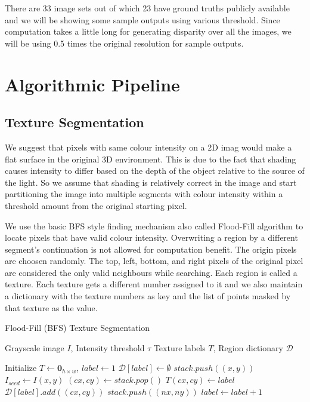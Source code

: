 \documentclass{article}
\begin{document}
There are 33 image sets out of which 23 have ground truths publicly available and we will be showing some sample outputs using various threshold. Since computation takes a little long 
for generating disparity over all the images, we will be using 0.5 times the original resolution for sample outputs.

\newpage
\section{Algorithmic Pipeline}
\vspace{1cm}
\subsection{Texture Segmentation}
\vspace{1cm}
We suggest that pixels with same colour intensity on a 2D imag would make a flat surface in the original 3D environment. This is due to the fact that shading causes intensity to 
differ based on the depth of the object relative to the source of the light. So we assume that shading is relatively correct in the image and start partitioning the image into 
multiple segments with colour intensity within a threshold amount from the original starting pixel. 

We use the basic BFS style finding mechanism also called Flood-Fill algorithm to locate pixels that have valid colour intensity. Overwriting a region by a different segment's 
continuation is not allowed for computation benefit. The origin pixels are choosen randomly. The top, left, bottom, and right pixels of the original pixel are considered 
the only valid neighbours while searching. Each region is called a texture. Each texture gets a different number assigned to it and we also maintain a dictionary with the texture numbers
as key and the list of points masked by that texture as the value.
\medskip
\begin{algorithm}[H]
\caption{Flood-Fill (BFS) Texture Segmentation}
\begin{algorithmic}[1]
\Require{} Grayscale image $I$, Intensity threshold $\tau$
\Ensure{}{} Texture labels $T$, Region dictionary $\mathcal{D}$

\State{}{} Initialize $T \gets \mathbf{0}_{h\times w}$, $label \gets 1$
        \State{} $\mathcal{D}[label] \gets \emptyset$
        \State{} $stack.push((x,y))$
        \State{} $I_{seed} \gets I(x,y)$
            \State{} $(cx,cy) \gets stack.pop()$
                \State{} $T(cx,cy) \gets label$
                \State{} $\mathcal{D}[label].add((cx,cy))$
                        \State{} $stack.push((nx,ny))$
                    \EndIf{}
                \EndFor{}
            \EndIf{}
        \EndWhile{}
        \State{} $label \gets label + 1$
    \EndIf{}
\EndFor{}
\end{algorithmic}
\end{algorithm}
\end{document}
